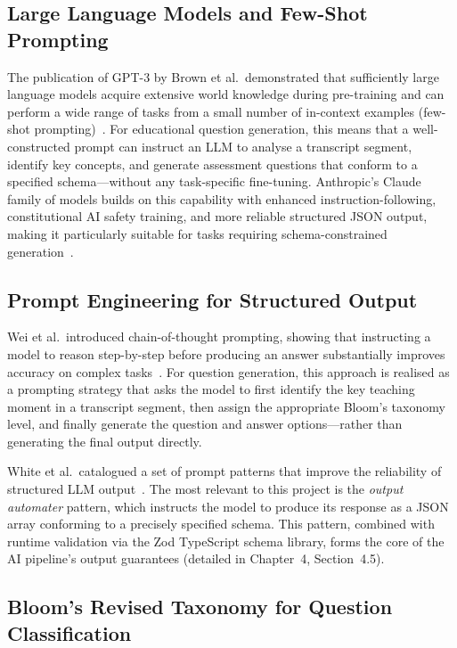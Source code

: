 \subsection{Large Language Models and Few-Shot Prompting}

The publication of GPT-3 by Brown et al.\ demonstrated that sufficiently
large language models acquire extensive world knowledge during pre-training
and can perform a wide range of tasks from a small number of in-context
examples (few-shot prompting)~\cite{brown2020}. For educational question
generation, this means that a well-constructed prompt can instruct an LLM
to analyse a transcript segment, identify key concepts, and generate
assessment questions that conform to a specified schema---without any
task-specific fine-tuning. Anthropic's Claude family of models builds on
this capability with enhanced instruction-following, constitutional AI
safety training, and more reliable structured JSON output, making it
particularly suitable for tasks requiring schema-constrained
generation~\cite{anthropic2024}.

\subsection{Prompt Engineering for Structured Output}

Wei et al.\ introduced chain-of-thought prompting, showing that instructing
a model to reason step-by-step before producing an answer substantially
improves accuracy on complex tasks~\cite{wei2022}. For question generation,
this approach is realised as a prompting strategy that asks the model to
first identify the key teaching moment in a transcript segment, then assign
the appropriate Bloom's taxonomy level, and finally generate the question
and answer options---rather than generating the final output directly.

White et al.\ catalogued a set of prompt patterns that improve the
reliability of structured LLM output~\cite{white2023}. The most relevant
to this project is the \emph{output automater} pattern, which instructs the
model to produce its response as a JSON array conforming to a precisely
specified schema. This pattern, combined with runtime validation via the
Zod TypeScript schema library, forms the core of the AI pipeline's output
guarantees (detailed in Chapter~4, Section~4.5).

\subsection{Bloom's Revised Taxonomy for Question Classification}

